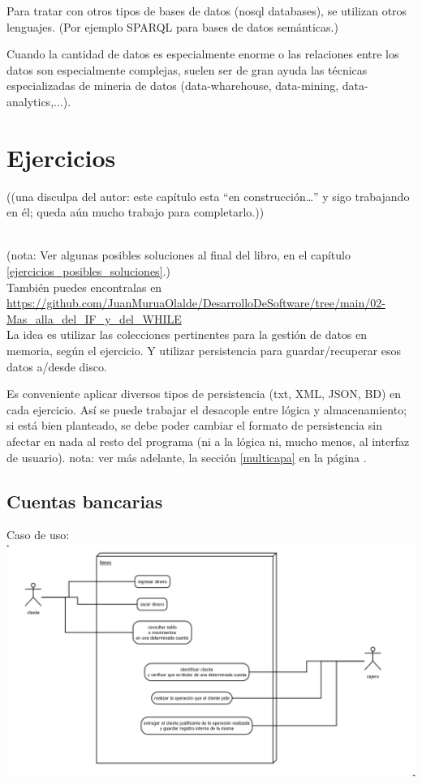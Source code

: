 \documentclass[spanish,12pt,a4paper,final,oneside]{book}
\begin{document}
Para tratar con otros tipos de bases de datos (nosql databases), se utilizan otros lenguajes. (Por ejemplo SPARQL para bases de datos semánticas.)

Cuando la cantidad de datos es especialmente enorme o las relaciones entre los datos son especialmente complejas, suelen ser de gran ayuda las técnicas especializadas de mineria de datos (data-wharehouse, data-mining, data-analytics,...).


\chapter{Ejercicios}\label{ejercicios_datos}

\begin{footnotesize}((una disculpa del autor: este capítulo esta ``en construcción\ldots'' y sigo trabajando en él; queda aún mucho trabajo para completarlo.))\end{footnotesize}
\\

(nota: Ver algunas posibles soluciones al final del libro, en el capítulo \ref{ejercicios_posibles_soluciones}.)
\\{\scriptsize También puedes encontralas en \url{https://github.com/JuanMuruaOlalde/DesarrolloDeSoftware/tree/main/02-Mas_alla_del_IF_y_del_WHILE}}
\\

La idea es utilizar las colecciones pertinentes para la gestión de datos en memoria, según el ejercicio. Y utilizar persistencia para guardar/recuperar esos datos a/desde disco.

Es conveniente aplicar diversos tipos de persistencia (txt, XML, JSON, BD) en cada ejercicio. Así se puede trabajar el desacople entre lógica y almacenamiento; si está bien planteado, se debe poder cambiar el formato de persistencia sin afectar en nada al resto del programa (ni a la lógica ni, mucho menos, al interfaz de usuario). nota: ver más adelante, la sección \ref{multicapa} en la página \pageref{multicapa}.

\section{Cuentas bancarias}\label{ejercicio_cuentasbancarias}

Caso de uso:\\
\includegraphics[width=\textwidth]{cuentas bancarias - caso de uso} 
\end{document}
